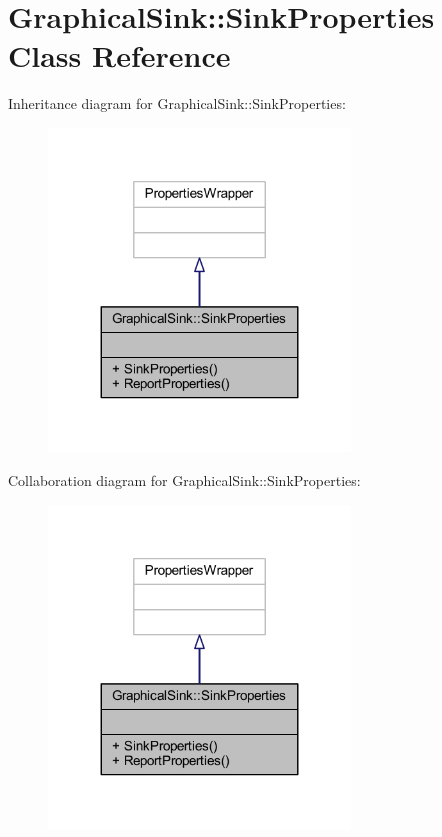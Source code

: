 \hypertarget{class_graphical_sink_1_1_sink_properties}{}\section{Graphical\+Sink\+:\+:Sink\+Properties Class Reference}
\label{class_graphical_sink_1_1_sink_properties}


Inheritance diagram for Graphical\+Sink\+:\+:Sink\+Properties\+:
\nopagebreak
\begin{figure}[H]
\begin{center}
\leavevmode
\includegraphics[width=227pt]{class_graphical_sink_1_1_sink_properties__inherit__graph}
\end{center}
\end{figure}


Collaboration diagram for Graphical\+Sink\+:\+:Sink\+Properties\+:
\nopagebreak
\begin{figure}[H]
\begin{center}
\leavevmode
\includegraphics[width=227pt]{class_graphical_sink_1_1_sink_properties__coll__graph}
\end{center}
\end{figure}
